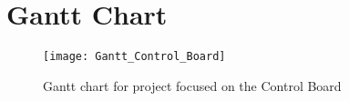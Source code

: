 \section{Gantt Chart}
\label{app:Gantts}

\begin{figure}[H]
\centering
\texttt{[image: Gantt\_Control\_Board]}
\caption{Gantt chart for project focused on the Control Board}
\label{fig:gantt}
\end{figure}